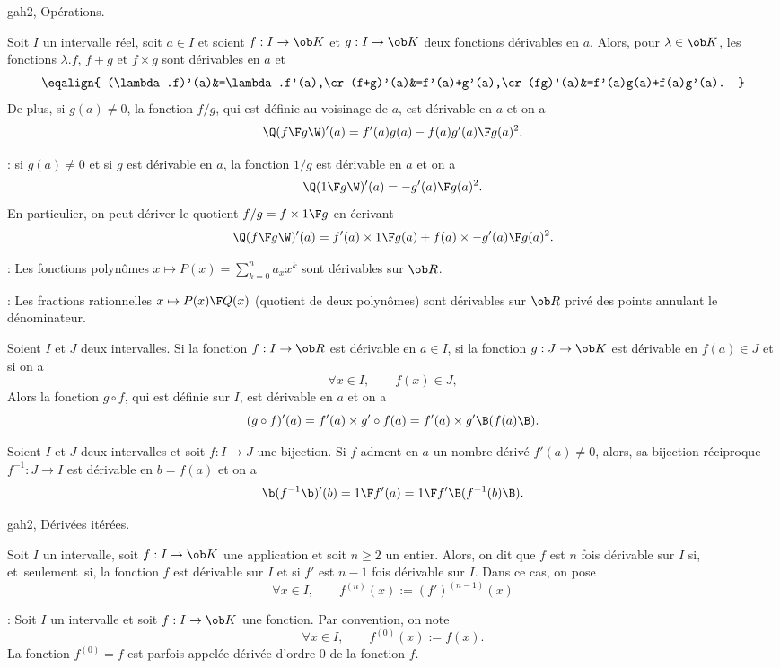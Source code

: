 \Subsection gah2, Opérations. 

 \quad
\Theoreme []  Soit $I$ un intervalle réel, soit $a\in I$ et soient $f:I\to\ob K$ et $g:I\to\ob K$ 
\pn
deux fonctions dérivables en $a$. 
Alors, pour $\lambda\in\ob K$, les fonctions $\lambda.f$, $f+g$ et $f\times g$ sont dérivables en $a$ et 
$$
\eqalign{
(\lambda.f)'(a)&=\lambda.f'(a),\cr
(f+g)'(a)&=f'(a)+g'(a),\cr
(fg)'(a)&=f'(a)g(a)+f(a)g'(a).
}
$$
De plus, si $g(a)\neq 0$, la fonction $f/g$, qui est définie au voisinage de $a$, est dérivable en $a$ et on a 
$$
\Q({f\F g}\W)'(a)={f'(a)g(a)-f(a)g'(a)\F g(a)^2}.
$$

\Remarque : si $g(a)\neq0$ et si $g$ est dérivable en $a$, la fonction $1/g$ est dérivable en $a$ et on a 
$$
\Q({1\F g}\W)'(a)=-{g'(a)\F g(a)^2}.
$$
En particulier, on peut dériver le quotient $f/g=f\times{1\F g}$ en écrivant 
$$
\Q({f\F g}\W)'(a)=f'(a)\times {1\F g(a)}+f(a)\times{-g'(a)\F g(a)^2}.
$$

\Remarque : Les fonctions polynômes $x\mapsto P(x)=\sum_{k=0}^n a_xx^k$ sont dérivables sur $\ob R$. 
\bigskip

\Remarque  : Les fractions rationnelles $x\mapsto {P(x)\F Q(x)}$ (quotient de deux polynômes) sont dérivables sur $\ob R$ privé des points annulant le dénominateur. 
\bigskip

 
\Theoreme []  Soient $I$ et $J$ deux intervalles. Si la fonction $f:I\to\ob R$ 
est dérivable en $a\in I$, si la fonction $g:J\to\ob K$ est dérivable en $f(a)\in J$ et si on a 
$$
\forall x\in I, \qquad f(x)\in J,
$$
Alors la fonction $g\circ f$, qui est définie sur $I$, est dérivable en $a$ et on a 
$$
(g\circ f)'(a)=f'(a)\times g'\circ f(a)=f'(a)\times g'\B(f(a)\B).
$$


 
\Theoreme []  Soient $I$ et $J$ deux intervalles et soit $f:I\to J$ une bijection. 
Si $f$ adment en $a$ un nombre dérivé $f'(a)\neq0$, alors, sa bijection réciproque $f^{-1}:J\to I$ est dérivable en $b=f(a)$ et on a 
$$
{\b(f^{-1}\b)'(b)={1\F f'(a)}={1\F f'\B(f^{-1}(b)\B)}}.
$$

\Subsection gah2, Dérivées itérées. 

\Definition []  Soit $I$ un intervalle, soit $f:I\to\ob K$ une application et soit $n\ge2$ un entier. Alors, on dit que $f$ est $n$ fois dérivable sur $I$ si, et~seulement~si, la fonction $f$ est dérivable sur $I$ et si $f'$ est $n-1$ fois 
dérivable sur $I$. Dans ce cas, on pose 
$$
\forall x\in I,\qquad f^{(n)}(x):=(f')^{(n-1)}(x)
$$


\Remarque : Soit $I$ un intervalle et soit $f:I\to\ob K$ une fonction. Par convention, on note 
$$
\forall x\in I, \qquad f^{(0)}(x):=f(x).
$$
La fonction $f^{(0)}=f$ est parfois appelée dérivée d'ordre $0$ de la fonction $f$. 
\bigskip

